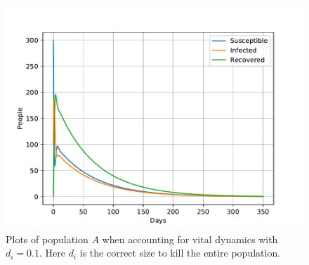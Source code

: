 \documentclass[a4paper]{article}
\begin{document}
\begin{figure}[!htb]
	\includegraphics[scale=0.56]{../plots/opp_c_k2l.pdf}	
	\caption{Plots of population $A$ when accounting for vital dynamics with $d_i=0.1$. Here $d_i$ is the correct size to kill the entire population. }
	\label{opp_c1}
\end{figure}
\end{document}
